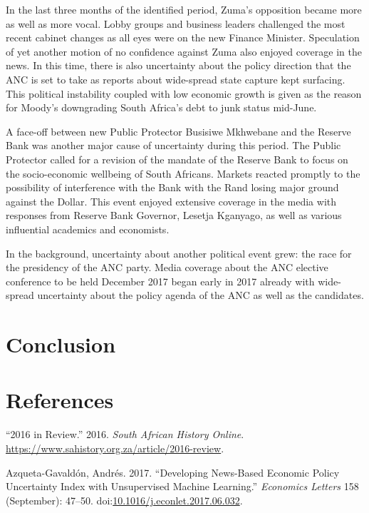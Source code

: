 \documentclass[11pt,preprint, authoryear]{elsarticle}
\numberwithin{equation}{section}
\numberwithin{figure}{section}
\numberwithin{table}{section}
\begin{document}
In the last three months of the identified period, Zuma's opposition
became more as well as more vocal. Lobby groups and business leaders
challenged the most recent cabinet changes as all eyes were on the new
Finance Minister. Speculation of yet another motion of no confidence
against Zuma also enjoyed coverage in the news. In this time, there is
also uncertainty about the policy direction that the ANC is set to take
as reports about wide-spread state capture kept surfacing. This
political instability coupled with low economic growth is given as the
reason for Moody's downgrading South Africa's debt to junk status
mid-June.

A face-off between new Public Protector Busisiwe Mkhwebane and the
Reserve Bank was another major cause of uncertainty during this period.
The Public Protector called for a revision of the mandate of the Reserve
Bank to focus on the socio-economic wellbeing of South Africans. Markets
reacted promptly to the possibility of interference with the Bank with
the Rand losing major ground against the Dollar. This event enjoyed
extensive coverage in the media with responses from Reserve Bank
Governor, Lesetja Kganyago, as well as various influential academics and
economists.

In the background, uncertainty about another political event grew: the
race for the presidency of the ANC party. Media coverage about the ANC
elective conference to be held December 2017 began early in 2017 already
with wide-spread uncertainty about the policy agenda of the ANC as well
as the candidates.

\section{\texorpdfstring{Conclusion
\label{sec_conclude}}{Conclusion }}\label{conclusion}

\newpage

\section*{References}\label{references}

\hypertarget{refs}{}
\hypertarget{ref-2016}{}
``2016 in Review.'' 2016. \emph{South African History Online}.
\url{https://www.sahistory.org.za/article/2016-review}.

\hypertarget{ref-Azqueta-Gavaldon2017}{}
Azqueta-Gavaldón, Andrés. 2017. ``Developing News-Based Economic Policy
Uncertainty Index with Unsupervised Machine Learning.'' \emph{Economics
Letters} 158 (September): 47--50.
doi:\href{https://doi.org/10.1016/j.econlet.2017.06.032}{10.1016/j.econlet.2017.06.032}.
\end{document}
